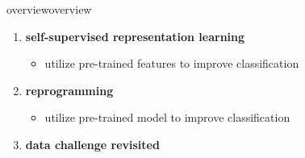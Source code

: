 \begin{frame}{overview}{overview}
		\begin{enumerate}
				\item   \textbf{self-supervised representation learning }
						\begin{itemize}
								\item   utilize pre-trained features to improve classification
						\end{itemize}
				\bigskip
				\item   \textbf{reprogramming} 
						\begin{itemize}
								\item   utilize pre-trained model to improve classification
						\end{itemize}
				\bigskip
				\item   \textbf{data challenge revisited} 
		\end{enumerate}
\end{frame}
